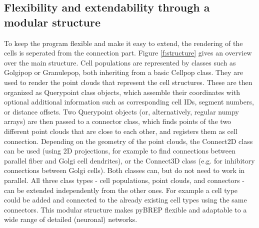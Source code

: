 \documentclass[12pt]{report}
\begin{document}

\subsection{Flexibility and extendability through a modular structure}
To keep the program flexible and make it easy to extend, the rendering of the cells is seperated from the connection part. Figure \ref{f:structure} gives an overview over the main structure. Cell populations are represented by classes such as Golgi\textunderscore pop or Granule\textunderscore pop, both inheriting from a basic Cell\textunderscore pop class. They are used to render the point clouds that represent the cell structures. These are then organized as Query\textunderscore point class objects, which assemble their coordinates with optional additional information such as corresponding cell IDs, segment numbers, or distance offsets. Two Query\textunderscore point objects (or, alternatively, regular numpy arrays) are then passed to a connector class, which finds points of the two different point clouds that are close to each other, and registers them as cell connection. Depending on the geometry of the point clouds, the Connect\textunderscore 2D class can be used (using 2D projections, for example to find connections between parallel fiber and Golgi cell dendrites), or the Connect\textunderscore 3D class (e.g. for inhibitory connections between Golgi cells). Both classes can, but do not need to work in parallel.
All three class types - cell populations, point clouds, and connectors - can be extended independently from the other ones. For example a cell type could be added and connected to the already existing cell types using the same connectors. This modular structure makes pyBREP flexible and adaptable to a wide range of detailed (neuronal) networks.
\end{document}
